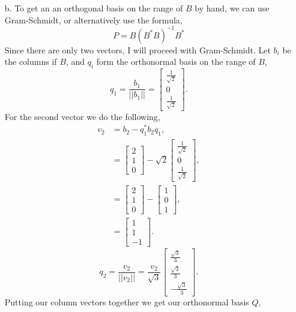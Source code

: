 \documentclass[12pt]{article}
\makeatletter
\theoremstyle{homework}
\newenvironment{exercise}[1]
{\def\@currentlabel{#1}\exercisecore}
{\endexercisecore}
\makeatother
\begin{document}
\begin{exercise}{6.4}
\begin{enumerate}
    \item[b.] To get an an orthogonal basis on the range of $B$ by hand, we can use Gram-Schmidt, or alternatively use the formula, 
    \begin{equation*}
      P = B(B^*B)^{-1}B^*
    \end{equation*} 
    Since there are only two vectors, I will proceed with Gram-Schmidt. Let $b_i$ be the columns if $B$, and $q_i$ form the orthonormal basis on the 
    range of $B$,
    \begin{equation*}
      q_1 = \frac{b_1}{||b_1||} = 
      \begin{bmatrix}
        \frac{1}{\sqrt{2}}\\
        0\\
        \frac{1}{\sqrt{2}}
      \end{bmatrix}. 
    \end{equation*}
    For the second vector we do the following, 
    \begin{align*}
    v_2 &= b_2 - q_1^*b_2q_1,\\
      &=
      \begin{bmatrix}
        2\\
        1\\
        0
      \end{bmatrix}
      -
      \sqrt{2}
      \begin{bmatrix}
        \frac{1}{\sqrt{2}}\\
        0\\
        \frac{1}{\sqrt{2}}
      \end{bmatrix},\\
      &=
      \begin{bmatrix}
        2\\
        1\\
        0
      \end{bmatrix}
      - 
      \begin{bmatrix}
        1\\
        0\\
        1
      \end{bmatrix},\\
      &=
      \begin{bmatrix}
        1\\
        1\\
        -1
      \end{bmatrix}.
    \end{align*}
    \begin{equation*}
      q_2 = \frac{v_2}{||v_2||} = \frac{v_2}{\sqrt{3}}
      \begin{bmatrix}
       \frac{\sqrt{3}}{3}\\
       \frac{\sqrt{3}}{3}\\
       -\frac{\sqrt{3}}{3}
      \end{bmatrix}.
    \end{equation*}
    Putting our column vectors together we get our orthonormal basis $Q$, 
    

\end{enumerate}
\end{exercise}
\end{document}
